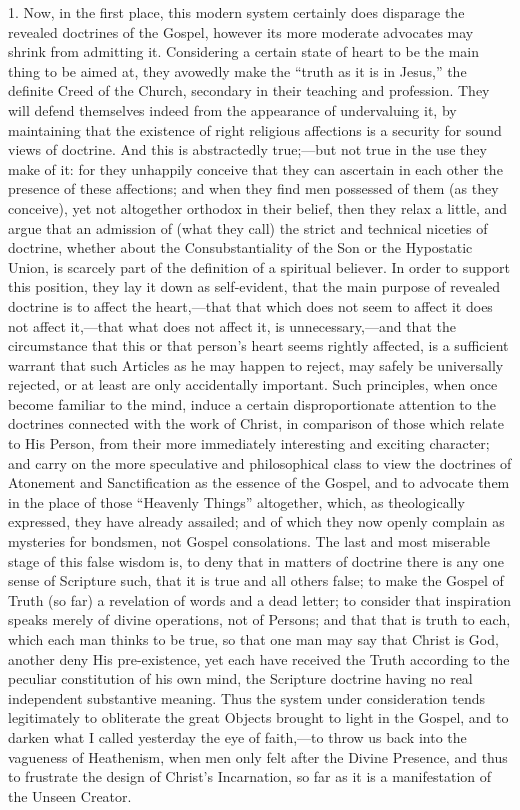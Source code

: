 1. Now, in the first place, this modern system certainly does
disparage the revealed doctrines of the Gospel, however its more
moderate advocates may shrink from admitting it. Considering a certain
state of heart to be the main thing to be aimed at, they avowedly make
the ``truth as it is in Jesus,'' the definite Creed of the
Church, secondary in their teaching and profession. They will defend
themselves indeed from the appearance of undervaluing it, by maintaining
that the existence of right religious affections is a security for sound
views of doctrine. And this is abstractedly true;—but not true in the
use they make of it: for they unhappily conceive that they can ascertain
in each other the presence of these affections; and when they find men
possessed of them (as they conceive), yet not altogether orthodox in
their belief, then they relax a little, and argue that an admission of
(what they call) the strict and technical niceties of doctrine, whether
about the Consubstantiality of the Son or the Hypostatic Union, is
scarcely part of the definition of a spiritual believer. In order to
support this position, they lay it down as self-evident, that the main
purpose of revealed doctrine is to affect the heart,—that that which
does not seem to affect it does not affect it,—that what does not
affect it, is unnecessary,—and that the circumstance that this or that
person's heart seems rightly affected, is a sufficient warrant that such
Articles as he may happen to reject, may safely be universally rejected,
or at least are only accidentally important. Such principles, when once
become familiar to the mind, induce a certain disproportionate attention
to the doctrines connected with the work of Christ, in comparison of
those which relate to His Person, from their more immediately
interesting and exciting character; and carry on the more speculative
and philosophical class to view the doctrines of Atonement and
Sanctification as the essence of the Gospel, and to advocate them in the
place of those ``Heavenly Things'' altogether, which, as
theologically expressed, they have already assailed; and of which they
now openly complain as mysteries for bondsmen, not Gospel consolations.
The last and most miserable stage of this false wisdom is, to deny that
in matters of doctrine there is any one sense of Scripture such, that it
is true and all others false; to make the Gospel of Truth (so far) a
revelation of words and a dead letter; to consider that inspiration
speaks merely of divine operations, not of Persons; and that that is
truth to each, which each man thinks to be true, so that one man may say
that Christ is God, another deny His pre-existence, yet each have
received the Truth according to the peculiar constitution of his own
mind, the Scripture doctrine having no real independent substantive
meaning. Thus the system under consideration tends legitimately to
obliterate the great Objects brought to light in the Gospel, and to
darken what I called yesterday the eye of faith,—to throw us back into
the vagueness of Heathenism, when men only felt after the Divine
Presence, and thus to frustrate the design of Christ's Incarnation, so
far as it is a manifestation of the Unseen Creator.

